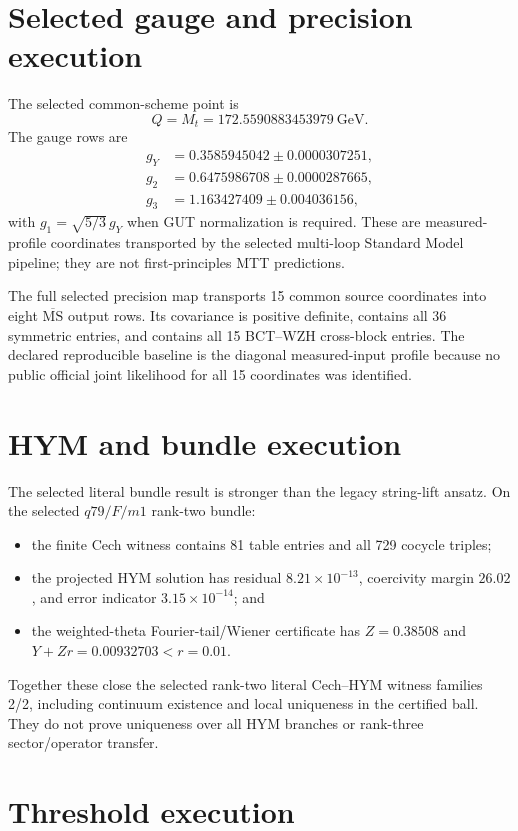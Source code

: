 \documentclass[11pt]{article}
\begin{document}
\section{Selected gauge and precision execution}

The selected common-scheme point is
\[
Q=M_t=172.5590883453979~\mathrm{GeV}.
\]
The gauge rows are
\begin{align}
g_Y&=0.3585945042\pm0.0000307251,\\
g_2&=0.6475986708\pm0.0000287665,\\
g_3&=1.163427409\pm0.004036156,
\end{align}
with $g_1=\sqrt{5/3}\,g_Y$ when GUT normalization is required. These are
measured-profile coordinates transported by the selected multi-loop Standard
Model pipeline; they are not first-principles MTT predictions.

The full selected precision map transports 15 common source coordinates into
eight $\overline{\mathrm{MS}}$ output rows. Its covariance is positive definite,
contains all 36 symmetric entries, and contains all 15 BCT--WZH cross-block
entries. The declared reproducible baseline is the diagonal measured-input
profile because no public official joint likelihood for all 15 coordinates was
identified.

\section{HYM and bundle execution}

The selected literal bundle result is stronger than the legacy string-lift
ansatz. On the selected $q79/F/m1$ rank-two bundle:
\begin{itemize}
\item the finite Cech witness contains 81 table entries and all 729 cocycle
triples;
\item the projected HYM solution has residual $8.21\times10^{-13}$,
coercivity margin $26.02$, and error indicator $3.15\times10^{-14}$; and
\item the weighted-theta Fourier-tail/Wiener certificate has
$Z=0.38508$ and $Y+Zr=0.00932703<r=0.01$.
\end{itemize}
Together these close the selected rank-two literal Cech--HYM witness families
2/2, including continuum existence and local uniqueness in the certified
ball. They do not prove uniqueness over all HYM branches or rank-three
sector/operator transfer.

\section{Threshold execution}
\end{document}
